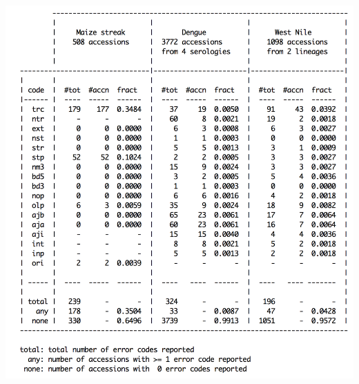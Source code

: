 \documentclass[landscape]{slides}
\begin{document}
\begin{slide}
\begin{center}
\includegraphics[height=8in]{figs/pilot-errcode-table-3}
\vfill
\end{center}
\end{slide}
\end{document}

